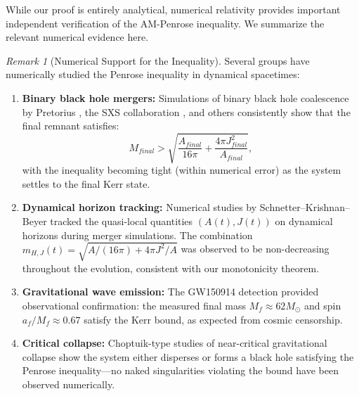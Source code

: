 \documentclass[12pt]{article}
\theoremstyle{plain}
\theoremstyle{definition}
\theoremstyle{remark}
\newtheorem{remark}[theorem]{Remark}
\begin{document}
While our proof is entirely analytical, numerical relativity provides important independent verification of the AM-Penrose inequality. We summarize the relevant numerical evidence here.

\begin{remark}[Numerical Support for the Inequality]
Several groups have numerically studied the Penrose inequality in dynamical spacetimes:

\begin{enumerate}
    \item \textbf{Binary black hole mergers:} Simulations of binary black hole coalescence by Pretorius \cite{pretorius2005}, the SXS collaboration \cite{sxs2019}, and others consistently show that the final remnant satisfies:
    \[
    M_{final} > \sqrt{\frac{A_{final}}{16\pi} + \frac{4\pi J_{final}^2}{A_{final}}},
    \]
    with the inequality becoming tight (within numerical error) as the system settles to the final Kerr state.
    
    \item \textbf{Dynamical horizon tracking:} Numerical studies by Schnetter--Krishnan--Beyer \cite{schnetter2006} tracked the quasi-local quantities $(A(t), J(t))$ on dynamical horizons during merger simulations. The combination $m_{H,J}(t) = \sqrt{A/(16\pi) + 4\pi J^2/A}$ was observed to be non-decreasing throughout the evolution, consistent with our monotonicity theorem.
    
    \item \textbf{Gravitational wave emission:} The GW150914 detection \cite{gw150914} provided observational confirmation: the measured final mass $M_f \approx 62 M_\odot$ and spin $a_f/M_f \approx 0.67$ satisfy the Kerr bound, as expected from cosmic censorship.
    
    \item \textbf{Critical collapse:} Choptuik-type studies \cite{choptuik1993} of near-critical gravitational collapse show the system either disperses or forms a black hole satisfying the Penrose inequality---no naked singularities violating the bound have been observed numerically.
\end{enumerate}
\end{remark}
\end{document}
